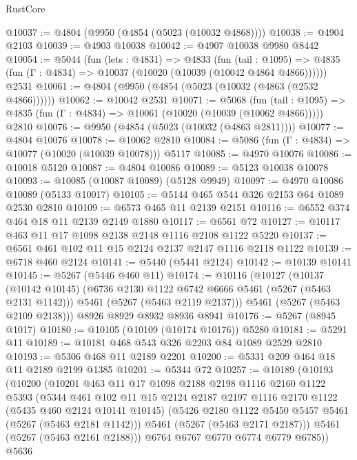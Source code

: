 \begin{lexlean}{RustCore}
\begin{coremodule}
@10037 := @4804 (@9950 (@4854 (@5023 (@10032 @4868))))
@10038 := @4904 @2103
@10039 := @4903 @10038
@10042 := @4907 @10038 @9980 @8442
@10054 := @5044
    (fun (lets : @4831) =>
    @4833
      (fun (tail : @1095) =>
      @4835 (fun (Γ : @4834) => @10037 (@10020 (@10039 (@10042 @4864 @4866))))))
    @2531
@10061 := @4804 (@9950 (@4854 (@5023 (@10032 (@4863 (@2532 @4866))))))
@10062 := @10042 @2531
@10071 := @5068
    (fun (tail : @1095) => @4835 (fun (Γ : @4834) => @10061 (@10020 (@10039 (@10062 @4866)))))
    @2810
@10076 := @9950 (@4854 (@5023 (@10032 (@4863 @2811))))
@10077 := @4804 @10076
@10078 := @10062 @2810
@10084 := @5086 (fun (Γ : @4834) => @10077 (@10020 (@10039 @10078))) @5117
@10085 := @4970 @10076
@10086 := @10018 @5120
@10087 := @4804 @10086
@10089 := @5123 @10038 @10078
@10093 := @10085 (@10087 @10089) (@5128 @9949)
@10097 := @4970 @10086 @10089 (@5133 @10017)
@10105 := @5144 @465 @544 @326 @2153 @64 @1089 @2530 @2810
@10109 := @6573 @465 @11 @2139 @2151
@10116 := @6552 @374 @464 @18 @11 @2139 @2149 @1880
@10117 := @6561 @72
@10127 := @10117 @463 @11 @17 @1098 @2138 @2148 @1116 @2108 @1122 @5220
@10137 := @6561 @461 @102 @11 @15 @2124 @2137 @2147 @1116 @2118 @1122
@10139 := @6718 @460 @2124
@10141 := @5440 (@5441 @2124)
@10142 := @10139 @10141
@10145 := @5267 (@5446 @460 @11)
@10174 := @10116
    (@10127
      (@10137
        (@10142 @10145)
        (@6736 @2130 @1122 @6742 @6666 @5461 (@5267 (@5463 @2131 @1142)))
        @5461
        (@5267 (@5463 @2119 @2137)))
      @5461
      (@5267 (@5463 @2109 @2138)))
    @8926
    @8929
    @8932
    @8936
    @8941
@10176 := @5267 (@8945 @1017)
@10180 := @10105 (@10109 (@10174 @10176)) @5280
@10181 := @5291 @11
@10189 := @10181 @468 @543 @326 @2203 @84 @1089 @2529 @2810
@10193 := @5306 @468 @11 @2189 @2201
@10200 := @5331 @209 @464 @18 @11 @2189 @2199 @1385
@10201 := @5344 @72
@10257 := @10189
    (@10193
      (@10200
        (@10201
          @463
          @11
          @17
          @1098
          @2188
          @2198
          @1116
          @2160
          @1122
          @5393
          (@5344
            @461
            @102
            @11
            @15
            @2124
            @2187
            @2197
            @1116
            @2170
            @1122
            (@5435 @460 @2124 @10141 @10145)
            (@5426 @2180 @1122 @5450 @5457 @5461 (@5267 (@5463 @2181 @1142)))
            @5461
            (@5267 (@5463 @2171 @2187)))
          @5461
          (@5267 (@5463 @2161 @2188)))
        @6764
        @6767
        @6770
        @6774
        @6779
        @6785))
    @5636

\end{coremodule}
\end{lexlean}
